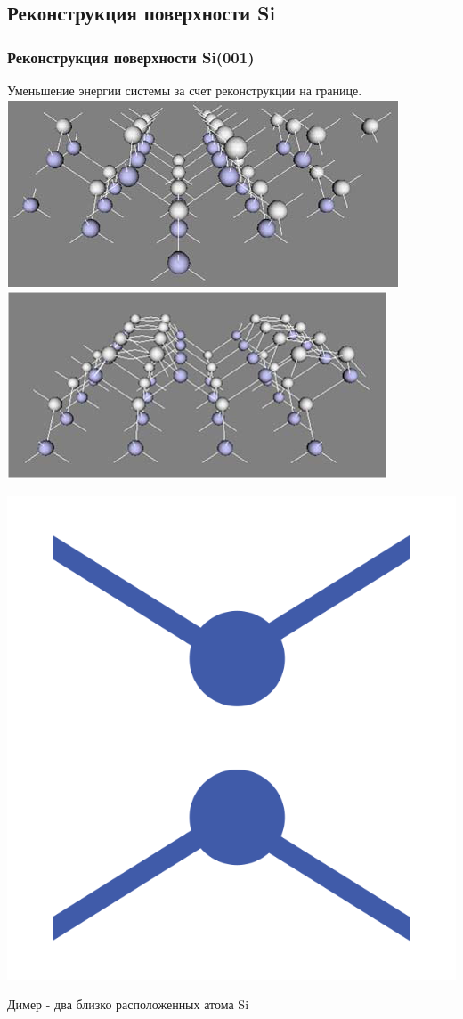 \documentclass[10pt,pdf,hyperref={unicode}, dvipsnames]{beamer}
\begin{document}
\subsection{Реконструкция поверхности Si}
\begin{frame}[t]
	\frametitle{Реконструкция поверхности Si(001)}
	Уменьшение энергии системы за счет реконструкции на границе.
	\includegraphics[width = .49\linewidth]{imgs/rec0.png}
	\includegraphics[width = .49\linewidth]{imgs/rec1.png}
	\centering
	\begin{minipage}{0.2\linewidth}
		\centering
		\includegraphics[width = .5\linewidth]{imgs/Dim1.png}
	\end{minipage}
	\begin{minipage}{0.79\linewidth}
		Димер - два близко расположенных атома Si
	\end{minipage}


\end{frame}
\end{document}
